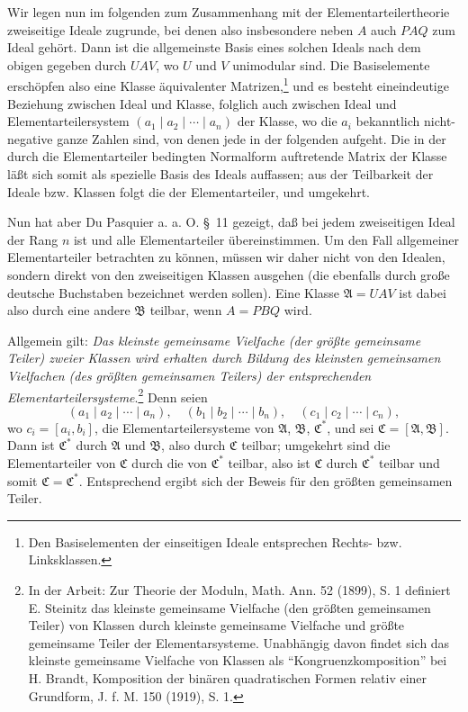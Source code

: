 \documentclass[11pt]{article}
\begin{document}
Wir legen nun im folgenden zum Zusammenhang mit der Elementarteilertheorie zweiseitige Ideale zugrunde, bei denen also insbesondere neben $A$ auch $PAQ$ zum Ideal gehört. Dann ist die allgemeinste Basis eines solchen Ideals nach dem obigen gegeben durch $UAV$, wo $U$ und $V$ unimodular sind. Die Basiselemente erschöpfen also eine Klasse äquivalenter Matrizen,\footnote{Den Basiselementen der einseitigen Ideale entsprechen Rechts- bzw. Linksklassen.} und es besteht eineindeutige Beziehung zwischen Ideal und Klasse, folglich auch zwischen Ideal und Elementarteilersystem $(a_1\mid a_2\mid\cdots\mid a_n)$ der Klasse, wo die $a_i$ bekanntlich nicht-negative ganze Zahlen sind, von denen jede in der folgenden aufgeht. Die in der durch die Elementarteiler bedingten Normalform auftretende Matrix der Klasse läßt sich somit als spezielle Basis des Ideals auffassen; aus der Teilbarkeit der Ideale bzw. Klassen folgt die der Elementarteiler, und umgekehrt.

Nun hat aber Du Pasquier a. a. O. \S~11 gezeigt, daß bei jedem zweiseitigen Ideal der Rang $n$ ist und alle Elementarteiler übereinstimmen. Um den Fall allgemeiner Elementarteiler betrachten zu können, müssen wir daher nicht von den Idealen, sondern direkt von den zweiseitigen Klassen ausgehen (die ebenfalls durch große deutsche Buchstaben bezeichnet werden sollen). Eine Klasse $\mathfrak A=UAV$ ist dabei also durch eine andere $\mathfrak B$ teilbar, wenn $A=PBQ$ wird.

Allgemein gilt: \emph{Das kleinste gemeinsame Vielfache (der größte gemeinsame Teiler) zweier Klassen wird erhalten durch Bildung des kleinsten gemeinsamen Vielfachen (des größten gemeinsamen Teilers) der entsprechenden Elementarteilersysteme}.\footnote{In der Arbeit: Zur Theorie der Moduln, Math. Ann. 52 (1899), S. 1 definiert E. Steinitz das kleinste gemeinsame Vielfache (den größten gemeinsamen Teiler) von Klassen durch kleinste gemeinsame Vielfache und größte gemeinsame Teiler der Elementarsysteme. Unabhängig davon findet sich das kleinste gemeinsame Vielfache von Klassen als ``Kongruenzkomposition'' bei H. Brandt, Komposition der binären quadratischen Formen relativ einer Grundform, J. f. M. 150 (1919), S. 1.} Denn seien
\[
 (a_1\mid a_2\mid\cdots\mid a_n),\quad
 (b_1\mid b_2\mid\cdots\mid b_n),\quad
 (c_1\mid c_2\mid\cdots\mid c_n),
\]
wo $c_i=[a_i,b_i]$, die Elementarteilersysteme von $\mathfrak A$, $\mathfrak B$, $\mathfrak C^*$, und sei $\mathfrak C=[\mathfrak A,\mathfrak B]$. Dann ist $\mathfrak C^*$ durch $\mathfrak A$ und $\mathfrak B$, also durch $\mathfrak C$ teilbar; umgekehrt sind die Elementarteiler von $\mathfrak C$ durch die von $\mathfrak C^*$ teilbar, also ist $\mathfrak C$ durch $\mathfrak C^*$ teilbar und somit $\mathfrak C=\mathfrak C^*$. Entsprechend ergibt sich der Beweis für den größten gemeinsamen Teiler.
\end{document}
